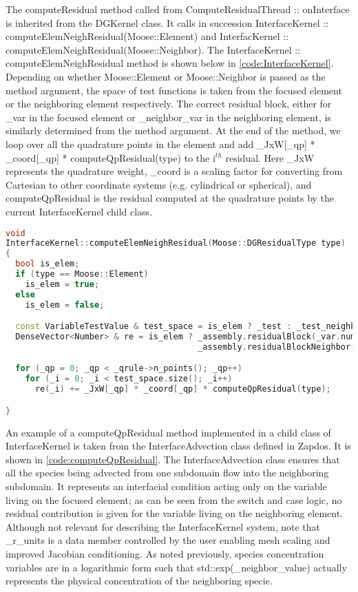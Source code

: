 The computeResidual method called from ComputeResidualThread :: onInterface is inherited from the DGKernel class. It calls in succession InterfaceKernel :: computeElemNeighResidual(Moose::Element) and InterfacKernel :: computeElemNeighResidual(Moose::Neighbor). The InterfaceKernel :: computeElemNeighResidual method is shown below in \cref{code:InterfaceKernel}. Depending on whether Moose::Element or Moose::Neighbor is passed as the method argument, the space of test functions is taken from the focused element or the neighboring element respectively. The correct residual block, either for \_var in the focused element or \_neighbor\_var in the neighboring element, is similarly determined from the method argument. At the end of the method, we loop over all the quadrature points in the element and add \_JxW[\_qp] * \_coord[\_qp] * computeQpResidual(type) to the i$^{th}$ residual. Here \_JxW represents the quadrature weight, \_coord is a scaling factor for converting from Cartesian to other coordinate systems (e.g. cylindrical or spherical), and computeQpResidual is the residual computed at the quadrature points by the current InterfaceKernel child class.

\begin{lstlisting}[language = C++, caption = The InterfaceKernel :: computeElemNeighResidual method responsible for calling compueQpResidual methods implemented in the various children of the InterfaceKernel class, label = code:InterfaceKernel]
void
InterfaceKernel::computeElemNeighResidual(Moose::DGResidualType type)
{
  bool is_elem;
  if (type == Moose::Element)
    is_elem = true;
  else
    is_elem = false;

  const VariableTestValue & test_space = is_elem ? _test : _test_neighbor;
  DenseVector<Number> & re = is_elem ? _assembly.residualBlock(_var.number()) :
                                       _assembly.residualBlockNeighbor(_neighbor_var.number());

  for (_qp = 0; _qp < _qrule->n_points(); _qp++)
    for (_i = 0; _i < test_space.size(); _i++)
      re(_i) += _JxW[_qp] * _coord[_qp] * computeQpResidual(type);

}
\end{lstlisting}

An example of a computeQpResidual method implemented in a child class of InterfaceKernel is taken from the InterfaceAdvection class defined in Zapdos. It is shown in \cref{code:computeQpResidual}. The InterfaceAdvection class ensures that all the species being advected from one subdomain flow into the neighboring subdomain. It represents an interfacial condition acting only on the variable living on the focused element; as can be seen from the switch and case logic, no residual contribution is given for the variable living on the neighboring element. Although not relevant for describing the InterfaceKernel system, note that \_r\_units is a data member controlled by the user enabling mesh scaling and improved Jacobian conditioning. As noted previously, species concentration variables are in a logarithmic form such that std::exp(\_neighbor\_value) actually represents the physical concentration of the neighboring specie.

